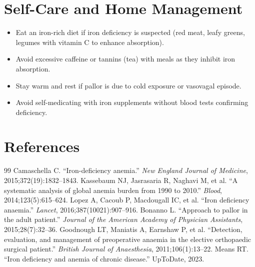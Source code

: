\section*{Self-Care and Home Management}
\begin{itemize}
  \item Eat an iron-rich diet if iron deficiency is suspected (red meat, leafy greens, legumes with vitamin C to enhance absorption).
  \item Avoid excessive caffeine or tannins (tea) with meals as they inhibit iron absorption.
  \item Stay warm and rest if pallor is due to cold exposure or vasovagal episode.
  \item Avoid self-medicating with iron supplements without blood tests confirming deficiency.
\end{itemize}

\section*{References}
\begin{thebibliography}{99}
 Camaschella C. ``Iron-deficiency anemia.'' \textit{New England Journal of Medicine}, 2015;372(19):1832--1843.
 Kassebaum NJ, Jasrasaria R, Naghavi M, et al. ``A systematic analysis of global anemia burden from 1990 to 2010.'' \textit{Blood}, 2014;123(5):615--624.
 Lopez A, Cacoub P, Macdougall IC, et al. ``Iron deficiency anaemia.'' \textit{Lancet}, 2016;387(10021):907--916.
 Bonanno L. ``Approach to pallor in the adult patient.'' \textit{Journal of the American Academy of Physician Assistants}, 2015;28(7):32--36.
 Goodnough LT, Maniatis A, Earnshaw P, et al. ``Detection, evaluation, and management of preoperative anaemia in the elective orthopaedic surgical patient.'' \textit{British Journal of Anaesthesia}, 2011;106(1):13--22.
 Means RT. ``Iron deficiency and anemia of chronic disease.'' UpToDate, 2023.

\end{thebibliography}
